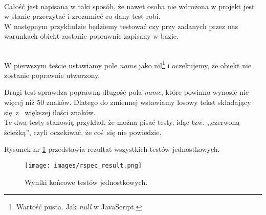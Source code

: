 \begin{code}
	
\end{code}\\

Całość jest napisana w taki sposób, że nawet osoba nie wdrożona w projekt jest w stanie przeczytać i zrozumieć co dany test robi.
\\

W następnym przykładzie będziemy testować czy przy zadanych przez nas warunkach obiekt zostanie poprawnie zapisany w bazie.

\begin{code}
	
\end{code}\\

W pierwszym teście ustawiamy pole \emph{name} jako nil\footnote{Wartość pusta. Jak \emph{null} w JavaScript.} i oczekujemy, że obiekt nie zostanie poprawnie utworzony.

Drugi test sprawdza poprawną długość pola \emph{name}, które powinno wynosić nie więcej niż 50 znaków. Dlatego do zmiennej wstawiamy losowy tekst składający się z~ większej ilości znaków.\\

Te dwa testy stanowią przykład, że można pisać testy, idąc tzw. ,,czerwoną ścieżką'', czyli oczekiwać, że coś się nie powiedzie.

Rysunek nr \ref{fig:all_rspec} przedstawia rezultat wszystkich testów jednostkowych.

\begin{figure}[h]
  \centering
  \texttt{[image: images/rspec\_result.png]}
  \caption{Wyniki końcowe testów jednostkowych.}
  \label{fig:all_rspec}
\end{figure}
